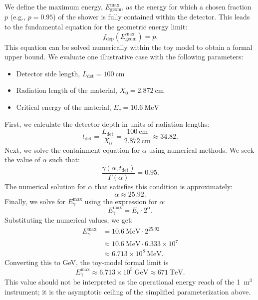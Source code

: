 \documentclass{aastex701}
\begin{document}
We define the maximum energy, $E_{\text{geom}}^{\text{max}}$, as the energy for which a chosen fraction $p$ (e.g., $p = 0.95$) of the shower is fully contained within the detector. This leads to the fundamental equation for the geometric energy limit:
\begin{equation}
f_{\text{dep}}(E_{\text{geom}}^{\text{max}}) = p.
\end{equation}
This equation can be solved numerically within the toy model to obtain a formal upper bound. We evaluate one illustrative case with the following parameters:
\begin{itemize}
    \item Detector side length, $L_{\mathrm{det}} = 100~\mathrm{cm}$
    \item Radiation length of the material, $X_0 = 2.872~\mathrm{cm}$
    \item Critical energy of the material, $E_c = 10.6~\mathrm{MeV}$ \cite{Workman:481642}


\end{itemize}
First, we calculate the detector depth in units of radiation lengths:
\begin{equation}
t_{\mathrm{det}} = \frac{L_{\mathrm{det}}}{X_0} = \frac{100~\mathrm{cm}}{2.872~\mathrm{cm}} \approx 34.82.
\end{equation}
Next, we solve the containment equation for $\alpha$ using numerical methods. We seek the value of $\alpha$ such that:
\begin{equation}
\frac{\gamma(\alpha, t_{\mathrm{det}})}{\Gamma(\alpha)} = 0.95.
\end{equation}
The numerical solution for $\alpha$ that satisfies this condition is approximately:
\begin{equation}
\alpha \approx 25.92.
\end{equation}
Finally, we solve for $E_{\gamma}^{\mathrm{max}}$ using the expression for $\alpha$:
\begin{equation}
E_{\gamma}^{\mathrm{max}} = E_c \cdot 2^\alpha.
\end{equation}
Substituting the numerical values, we get:
\begin{align}
E_{\gamma}^{\mathrm{max}} &= 10.6~\mathrm{MeV} \cdot 2^{25.92} \\
&\approx 10.6~\mathrm{MeV} \cdot 6.333 \times 10^7 \\
&\approx 6.713 \times 10^8~\mathrm{MeV}.
\end{align}
Converting this to GeV, the toy-model formal limit is
\begin{equation}
E_{\gamma}^{\mathrm{max}} \approx 6.713 \times 10^5~\mathrm{GeV} \approx 671 ~\mathrm{TeV}.
\end{equation}
This value should not be interpreted as the operational energy reach of the 1~m$^3$ instrument; it is the asymptotic ceiling of the simplified parameterization above.
\end{document}

